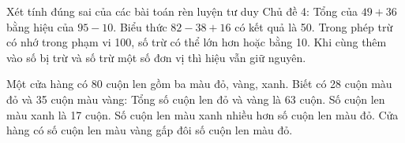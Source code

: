 \begin{ex} %
Xét tính đúng sai của các bài toán rèn luyện tư duy Chủ đề 4:
\choiceTF
{\True Tổng của $49 + 36$ bằng hiệu của $95 - 10$.}
{Biểu thức $82 - 38 + 16$ có kết quả là 50.}
{\True Trong phép trừ có nhớ trong phạm vi 100, số trừ có thể lớn hơn hoặc bằng 10.}
{\True Khi cùng thêm vào số bị trừ và số trừ một số đơn vị thì hiệu vẫn giữ nguyên.}
\end{ex}

\begin{ex} %
Một cửa hàng có 80 cuộn len gồm ba màu đỏ, vàng, xanh. Biết có 28 cuộn màu đỏ và 35 cuộn màu vàng:
\choiceTF
{\True Tổng số cuộn len đỏ và vàng là 63 cuộn.}
{\True Số cuộn len màu xanh là 17 cuộn.}
{Số cuộn len màu xanh nhiều hơn số cuộn len màu đỏ.}
{Cửa hàng có số cuộn len màu vàng gấp đôi số cuộn len màu đỏ.}
\end{ex}

